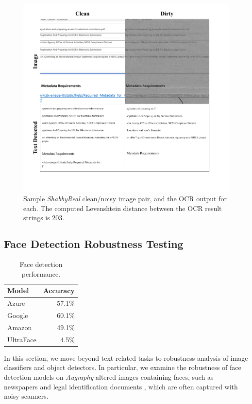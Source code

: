 \documentclass[runningheads]{llncs}
\begin{document}
\begin{figure}
\centering
\includegraphics[width=0.9\columnwidth]{figures/ocr_figure.png}
\caption{Sample \emph{ShabbyReal} clean/noisy image pair, and the OCR output for each. The computed Levenshtein distance between the OCR result strings is 203.}
\label{fig:ocr_output}
\end{figure}

\subsection{Face Detection Robustness Testing}
\begin{table}
    \centering
    \caption{Face detection performance.}
    \begin{tabular}{lr}
    \toprule
        \textbf{Model} & \textbf{Accuracy} \\
        \midrule
        Azure & 57.1\%\\
        Google & 60.1\%\\
        Amazon & 49.1\%\\
        UltraFace & 4.5\%\\
        \bottomrule
    \end{tabular}
    \label{tab:face-detection-results}
\end{table}
In this section, we move beyond text-related tasks to robustness analysis of image classifiers and object detectors. In particular, we examine the robustness of face detection models on \emph{Augraphy}-altered images containing faces, such as newspapers \cite{newspaper-navigator} and legal identification documents \cite{midv-500}, which are often captured with noisy scanners.
\end{document}

